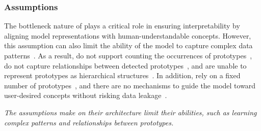 \subsubsection{\texorpdfstring{\colorbox[RGB]{255,199,166}{Assumptions}}{Assumptions}}
\label{sssec:chall:gen:assum}
The bottleneck nature of \ppms plays a critical role in ensuring interpretability by aligning model representations with human-understandable concepts. However, this assumption can also limit the ability of the model to capture complex data patterns~\citep{Zheng_2024_PrototypicalHash}. As a result, \ppms do not support counting the occurrences of prototypes~\citep{Nauta_2023_PIPNetPatchBasedIntuitive}, do not capture relationships between detected prototypes~\citep{Zhang_2023_Learningselectprototypical}, and are unable to represent prototypes as hierarchical structures~\citep{Wang_2021_InterpretableImageRecognition}.
In addition, \ppms rely on a fixed number of prototypes~\citep{Barnett_2021_casebasedinterpretabledeep}, and there are no mechanisms to guide the model toward user-desired concepts without risking data leakage~\citep{Bontempelli_2023_ConceptlevelDebuggingPartPrototype}.

\textit{The assumptions \ppms make on their architecture limit their abilities, such as learning complex patterns and relationships between prototypes.}

